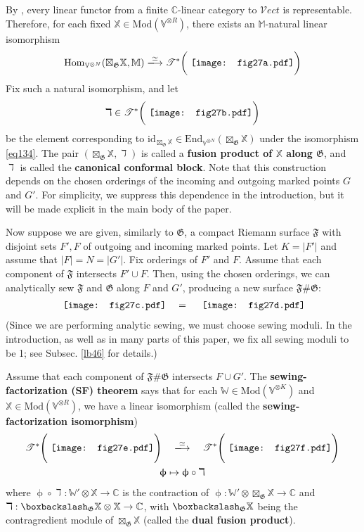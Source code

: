 \documentclass[11pt,b5paper,notitlepage]{article}
\theoremstyle{definition}
\theoremstyle{plain}
\newcommand{\End}{\mathrm{End}} %
\newcommand{\Hom}{\mathrm{Hom}}
\newcommand{\Vect}{\mathcal Vect}
\newcommand{\Vbb}{\mathbb V}
\newcommand{\Xbb}{\mathbb X}
\newcommand{\Wbb}{\mathbb W}
\newcommand{\Mbb}{\mathbb M}
\newcommand{\Cbb}{\mathbb C}
\newcommand{\<}{\left\langle}
\renewcommand{\>}{\right\rangle}
\newcommand{\ST}{\mathscr{T}}
\newcommand{\bbs}{\boxbackslash}
\newcommand{\Mod}{\mathrm{Mod}}
\newcommand{\id}{\mathrm{id}}
\newcommand{\ff}{\mathfrak{F}}
\newcommand{\fg}{\mathfrak{G}}
\numberwithin{equation}{section}
\begin{document}
By \cite{DSPS19-balanced}, every linear functor from a finite $\Cbb$-linear category to $\Vect$ is representable. Therefore, for each fixed $\Xbb\in\Mod(\Vbb^{\otimes R})$, there exists an $\Mbb$-natural linear isomorphism
\begin{align}\label{eq134}
\Hom_{\Vbb^{\otimes N}}(\boxtimes_\fg\Xbb,\Mbb)\xlongrightarrow{\simeq}\ST^*\bigg(\vcenter{\hbox{{
		\texttt{[image: fig27a.pdf]}}}}\bigg)
\end{align}
Fix such a natural isomorphism, and let
\begin{align*}
\daleth\in \ST^*\bigg(\vcenter{\hbox{{
		\texttt{[image: fig27b.pdf]}}}}\bigg)
\end{align*}
be the element corresponding to $\id_{\boxtimes_\fg\Xbb}\in\End_{\Vbb^{\otimes N}}(\boxtimes_\fg\Xbb)$ under the isomorphism \eqref{eq134}. The pair $(\boxtimes_\fg\Xbb,\daleth)$ is called a \textbf{fusion product of $\Xbb$ along $\fg$}, and $\daleth$ is called the \textbf{canonical conformal block}. Note that this construction depends on the chosen orderings of the incoming and outgoing marked points $G$ and $G'$. For simplicity, we suppress this dependence in the introduction, but it will be made explicit in the main body of the paper.

Now suppose we are given, similarly to $\fg$, a compact Riemann surface $\ff$ with disjoint sets $F',F$ of outgoing and incoming marked points. Let $K=|F'|$ and assume that $|F|=N=|G'|$. Fix orderings of $F'$ and $F$. Assume that each component of $\ff$ intersects $F'\cup F$. Then, using the chosen orderings, we can analytically sew $\ff$ and $\fg$ along $F$ and $G'$, producing a new surface $\ff \# \fg$:
\begin{align*}
\vcenter{\hbox{{
		\texttt{[image: fig27c.pdf]}}}}\quad=\quad\vcenter{\hbox{{
		\texttt{[image: fig27d.pdf]}}}}
\end{align*}
(Since we are performing analytic sewing, we must choose sewing moduli. In the introduction, as well as in many parts of this paper, we fix all sewing moduli to be 1; see Subsec. \ref{lb46} for details.)

Assume that each component of $\ff\#\fg$ intersects $F\cup G'$. The \textbf{sewing-factorization (SF) theorem} says that for each $\Wbb\in\Mod(\Vbb^{\otimes K})$ and $\Xbb\in\Mod(\Vbb^{\otimes R})$, we have a linear isomorphism (called the \textbf{sewing-factorization isomorphism})
\begin{gather}\label{eq135}
\begin{gathered}
\ST^*\Bigg(\vcenter{\hbox{{
		\texttt{[image: fig27e.pdf]}}}}\Bigg)\quad\xlongrightarrow{\simeq}\quad\ST^*\Bigg(\vcenter{\hbox{{
		\texttt{[image: fig27f.pdf]}}}}\Bigg)\\ \upphi\mapsto\upphi\circ\daleth
\end{gathered}
\end{gather}
where $\upphi\circ\daleth:\Wbb'\otimes\Xbb\rightarrow\Cbb$ is the contraction of $\upphi:\Wbb'\otimes\boxtimes_\fg\Xbb\rightarrow\Cbb$ and $\daleth:\bbs_\fg\Xbb\otimes\Xbb\rightarrow\Cbb$, with $\bbs_\fg\Xbb$ being the contragredient module of $\boxtimes_\fg\Xbb$ (called the \textbf{dual fusion product}). 
\end{document}
